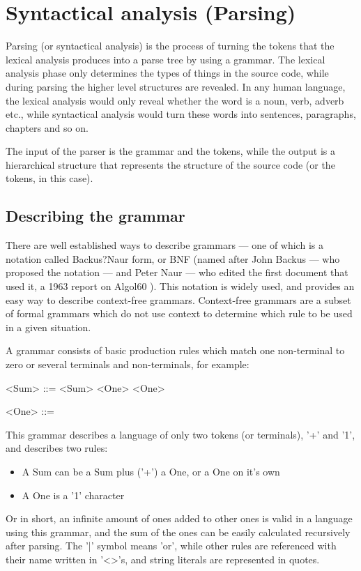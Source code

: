\chapter{Syntactical analysis (Parsing)}
Parsing (or syntactical analysis) is the process of turning the tokens that the lexical analysis produces into a parse tree by using a grammar. The lexical analysis phase only determines the types of things in the source code, while during parsing the higher level structures are revealed. In any human language, the lexical analysis would only reveal whether the word is a noun, verb, adverb etc., while syntactical analysis would turn these words into sentences, paragraphs, chapters and so on.

The input of the parser is the grammar and the tokens, while the output is a hierarchical structure that represents the structure of the source code (or the tokens, in this case).
\section{Describing the grammar}
There are well established ways to describe grammars --- one of which is a notation called Backus?Naur form, or BNF (named after John Backus --- who proposed the notation --- and Peter Naur --- who edited the first document that used it, a 1963 report on Algol60 \cite{backus1963revised}). This notation is widely used, and provides an easy way to describe context-free grammars. Context-free grammars are a subset of formal grammars which do not use context to determine which rule to be used in a given situation.

A grammar consists of basic production rules which match one non-terminal to zero or several terminals and non-terminals, for example:
\begin{grammar}
<Sum> ::= <Sum> \lit{+} <One>
    \alt <One> 

<One> ::= 
\end{grammar}

This grammar describes a language of only two tokens (or terminals), '+' and '1', and describes two rules:
\begin{itemize}
\item A Sum can be a Sum plus ('+') a One, or a One on it's own
\item A One is a '1' character
\end{itemize}
Or in short, an infinite amount of ones added to other ones is valid in a language using this grammar, and the sum of the ones can be easily calculated recursively after parsing. The '|' symbol means 'or', while other rules are referenced with their name written in '<>'s, and string literals are represented in quotes.

